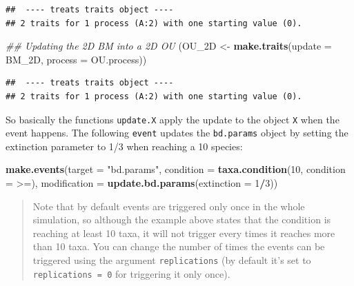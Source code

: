 \documentclass[
]{book}
\newenvironment{Shaded}{\begin{snugshade}}{\end{snugshade}}
\newcommand{\CommentTok}[1]{\textcolor[rgb]{0.56,0.35,0.01}{\textit{#1}}}
\newcommand{\DataTypeTok}[1]{\textcolor[rgb]{0.13,0.29,0.53}{#1}}
\newcommand{\DecValTok}[1]{\textcolor[rgb]{0.00,0.00,0.81}{#1}}
\newcommand{\KeywordTok}[1]{\textcolor[rgb]{0.13,0.29,0.53}{\textbf{#1}}}
\newcommand{\NormalTok}[1]{#1}
\newcommand{\OperatorTok}[1]{\textcolor[rgb]{0.81,0.36,0.00}{\textbf{#1}}}
\newcommand{\StringTok}[1]{\textcolor[rgb]{0.31,0.60,0.02}{#1}}
\begin{document}
\begin{verbatim}
##  ---- treats traits object ---- 
## 2 traits for 1 process (A:2) with one starting value (0).
\end{verbatim}

\begin{Shaded}
\begin{Highlighting}[]
\CommentTok{\#\# Updating the 2D BM into a 2D OU}
\NormalTok{(OU\_2D \textless{}{-}}\StringTok{ }\KeywordTok{make.traits}\NormalTok{(}\DataTypeTok{update =}\NormalTok{ BM\_2D, }\DataTypeTok{process =}\NormalTok{ OU.process))}
\end{Highlighting}
\end{Shaded}

\begin{verbatim}
##  ---- treats traits object ---- 
## 2 traits for 1 process (A:2) with one starting value (0).
\end{verbatim}

So basically the functions \texttt{update.X} apply the update to the object \texttt{X} when the event happens.
The following \texttt{event} updates the \texttt{bd.params} object by setting the extinction parameter to 1/3 when reaching a 10 species:

\begin{Shaded}
\begin{Highlighting}[]
\KeywordTok{make.events}\NormalTok{(}\DataTypeTok{target       =} \StringTok{"bd.params"}\NormalTok{,}
            \DataTypeTok{condition    =} \KeywordTok{taxa.condition}\NormalTok{(}\DecValTok{10}\NormalTok{, }\DataTypeTok{condition =} \StringTok{\textasciigrave{}}\DataTypeTok{\textgreater{}=}\StringTok{\textasciigrave{}}\NormalTok{),}
            \DataTypeTok{modification =} \KeywordTok{update.bd.params}\NormalTok{(}\DataTypeTok{extinction =} \DecValTok{1}\OperatorTok{/}\DecValTok{3}\NormalTok{))}
\end{Highlighting}
\end{Shaded}

\begin{quote}
Note that by default events are triggered only once in the whole simulation, so although the example above states that the condition is reaching at least 10 taxa, it will not trigger every times it reaches more than 10 taxa. You can change the number of times the events can be triggered using the argument \texttt{replications} (by default it's set to \texttt{replications\ =\ 0} for triggering it only once).
\end{quote}
\end{document}
